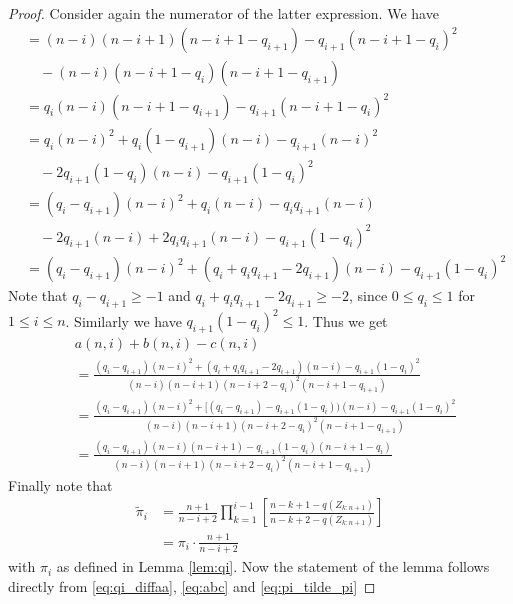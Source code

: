\begin{lemma}
\begin{proof}
		Consider again the numerator of the latter expression. We have
		\begin{align}
		&= (n-i)(n-i+1)(n-i+1-q_{i+1}) - q_{i+1}(n-i+1-q_i)^2 \nonumber\\
		& \quad - (n-i)(n-i+1-q_i)(n-i+1-q_{i+1})\nonumber\\
		&= q_i(n-i)(n-i+1-q_{i+1}) - q_{i+1}(n-i+1-q_i)^2 \nonumber\\
		&= q_i(n-i)^2 + q_i(1-q_{i+1})(n-i) -q_{i+1}(n-i)^2 \nonumber\\
		&\quad - 2q_{i+1}(1-q_i)(n-i) - q_{i+1}(1-q_i)^2 \nonumber\\	
		&= (q_i-q_{i+1})(n-i)^2 + q_i(n-i) - q_iq_{i+1}(n-i) \nonumber\\
		&\quad - 2q_{i+1}(n-i) + 2q_iq_{i+1}(n-i) - q_{i+1}(1-q_i)^2 \nonumber\\
		&= (q_i-q_{i+1})(n-i)^2 + (q_i + q_iq_{i+1} - 2q_{i+1})(n-i) - q_{i+1}(1-q_i)^2 \nonumber
		\end{align}
		Note that $q_i - q_{i+1} \geq -1$ and $q_i + q_iq_{i+1} - 2q_{i+1} \geq -2$, since $0\leq q_i \leq 1$ for $1\leq i \leq n$. Similarly we have $q_{i+1}(1-q_i)^2 \leq 1$. Thus we get 
		\begin{align}
		& a(n,i) + b(n,i) - c(n,i) \nonumber\\
		&= \frac{(q_i-q_{i+1})(n-i)^2 + (q_i + q_iq_{i+1} - 2q_{i+1})(n-i) - q_{i+1}(1-q_i)^2}{(n-i)(n-i+1)(n-i+2-q_i)^2(n-i+1-q_{i+1})}\nonumber\\
		&= \frac{(q_i-q_{i+1})(n-i)^2 + [(q_i - q_{i+1}) - q_{i+1}(1-q_i))(n-i) - q_{i+1}(1-q_i)^2}{(n-i)(n-i+1)(n-i+2-q_i)^2(n-i+1-q_{i+1})}\nonumber\\
		&= \frac{(q_i-q_{i+1})(n-i)(n-i+1) - q_{i+1}(1-q_i)(n-i+1-q_i)}{(n-i)(n-i+1)(n-i+2-q_i)^2(n-i+1-q_{i+1})}\label{eq:abc}
		\end{align}
		Finally note that 
		\begin{align}
		\tilde{\pi}_i &= \frac{n+1}{n-i+2}\prod\limits_{k=1}^{i-1} \left[\frac{n-k+1-q(Z_{k:n+1})}{n-k+2-q(Z_{k:n+1})}\right]\nonumber\\
		&= \pi_i \cdot \frac{n+1}{n-i+2}
		\label{eq:pi_tilde_pi}
		\end{align}
		with $\pi_i$ as defined in Lemma \ref{lem:qi}. Now the statement of the lemma follows directly from \eqref{eq:qi_diffaa}, \eqref{eq:abc} and \eqref{eq:pi_tilde_pi}
	\end{proof}
\end{lemma}
%
%
%
